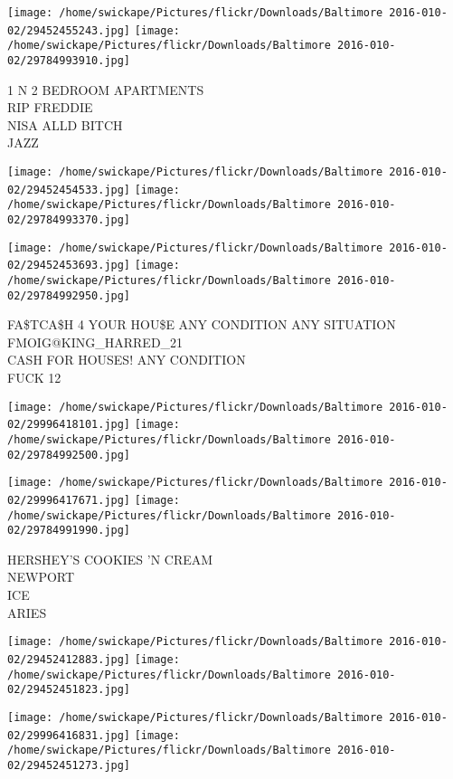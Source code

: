 \documentclass[10pt,letterpaper]{article}
\begin{document}
\texttt{[image: /home/swickape/Pictures/flickr/Downloads/Baltimore 2016-010-02/29452455243.jpg]}
\texttt{[image: /home/swickape/Pictures/flickr/Downloads/Baltimore 2016-010-02/29784993910.jpg]}

1 N 2 BEDROOM APARTMENTS\\
RIP FREDDIE\\
NISA ALLD BITCH\\
JAZZ\\
\pagebreak

\texttt{[image: /home/swickape/Pictures/flickr/Downloads/Baltimore 2016-010-02/29452454533.jpg]}
\texttt{[image: /home/swickape/Pictures/flickr/Downloads/Baltimore 2016-010-02/29784993370.jpg]}

\texttt{[image: /home/swickape/Pictures/flickr/Downloads/Baltimore 2016-010-02/29452453693.jpg]}
\texttt{[image: /home/swickape/Pictures/flickr/Downloads/Baltimore 2016-010-02/29784992950.jpg]}

FA\$TCA\$H 4 YOUR HOU\$E ANY CONDITION ANY SITUATION\\
FMOIG@KING\_HARRED\_21\\
CASH FOR HOUSES!  ANY CONDITION\\
FUCK 12\\
\pagebreak

\texttt{[image: /home/swickape/Pictures/flickr/Downloads/Baltimore 2016-010-02/29996418101.jpg]}
\texttt{[image: /home/swickape/Pictures/flickr/Downloads/Baltimore 2016-010-02/29784992500.jpg]}

\texttt{[image: /home/swickape/Pictures/flickr/Downloads/Baltimore 2016-010-02/29996417671.jpg]}
\texttt{[image: /home/swickape/Pictures/flickr/Downloads/Baltimore 2016-010-02/29784991990.jpg]}

HERSHEY'S COOKIES 'N CREAM\\
NEWPORT\\
ICE\\
ARIES\\
\pagebreak

\texttt{[image: /home/swickape/Pictures/flickr/Downloads/Baltimore 2016-010-02/29452412883.jpg]}
\texttt{[image: /home/swickape/Pictures/flickr/Downloads/Baltimore 2016-010-02/29452451823.jpg]}

\texttt{[image: /home/swickape/Pictures/flickr/Downloads/Baltimore 2016-010-02/29996416831.jpg]}
\texttt{[image: /home/swickape/Pictures/flickr/Downloads/Baltimore 2016-010-02/29452451273.jpg]}
\end{document}
